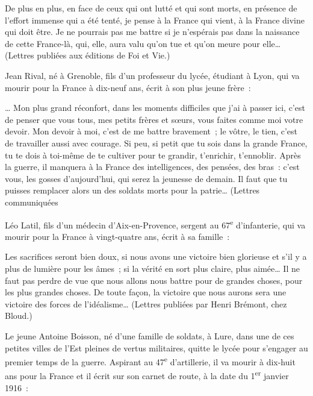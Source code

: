 \documentclass[french,twoside]{book} %
\newenvironment{quoteblock}%
  {\begin{quoting}}
  {\end{quoting}}
\newenvironment{quotebar}{%
    \def\FrameCommand{{\color{rubric!10!}\vrule width 0.5em} \hspace{0.9em}}%
    \def\OuterFrameSep{\itemsep} %
    \MakeFramed {\advance\hsize-\width \FrameRestore}
  }%
  {%
    \endMakeFramed
  }
\renewenvironment{quoteblock}%
  {%
    \savenotes
    \setstretch{0.9}
    \normalfont
    \begin{quotebar}
  }
  {%
    \end{quotebar}
    \spewnotes
  }
\begin{document}
\begin{quoteblock}
 \noindent De plus en plus, en face de ceux qui ont lutté et qui sont morts, en présence de l’effort immense qui a été tenté, je pense à la France qui vient, à la France divine qui doit être. Je ne pourrais pas me battre si je n’espérais pas dans la naissance de cette France-là, qui, elle, aura valu qu’on tue et qu’on meure pour elle… (Lettres publiées aux éditions de Foi et Vie.)‌
 \end{quoteblock}

\noindent Jean Rival, né à Grenoble, fils d’un professeur du lycée, étudiant à Lyon, qui va mourir pour la France à dix-neuf ans, écrit à son plus jeune frère :‌\par

\begin{quoteblock}
 \noindent … Mon plus grand réconfort, dans les moments difficiles que j’ai à passer ici, c’est de penser que vous tous, mes petits frères et sœurs, vous faites comme moi votre devoir. Mon devoir à moi, c’est de me battre bravement ; le vôtre, le tien, c’est de travailler aussi avec courage. Si peu, si petit que tu sois dans la grande France, tu te dois à toi-même de te cultiver pour te grandir, t’enrichir, t’ennoblir. Après la guerre, il manquera à la France des intelligences, des pensées, des bras : c’est vous, les gosses d’aujourd’hui, qui serez la jeunesse de demain. Il faut que tu puisses remplacer alors un des soldats morts pour la patrie… (Lettres communiquées‌
 \end{quoteblock}

\noindent Léo Latil, fils d’un médecin d’Aix-en-Provence, sergent au 67\textsuperscript{e} d’infanterie, qui va mourir pour la France à vingt-quatre ans, écrit à sa famille :‌\par

\begin{quoteblock}
 \noindent Les sacrifices seront bien doux, si nous avons une victoire bien glorieuse et s’il y a plus de lumière pour les âmes ; si la vérité en sort plus claire, plus aimée… Il ne faut pas perdre de vue que nous allons nous battre pour de grandes choses, pour les plus grandes choses. De toute façon, la victoire que nous aurons sera une victoire des forces de l’idéalisme… (Lettres publiées par Henri Brémont, chez Bloud.)‌
 \end{quoteblock}

\noindent Le jeune Antoine Boisson, né d’une famille de soldats, à Lure, dans une de ces petites villes de l’Est pleines de vertus militaires, quitte le lycée pour s’engager au premier temps de la guerre. Aspirant au 47\textsuperscript{e} d’artillerie, il va mourir à dix-huit ans pour la France et il écrit sur son carnet de route, à la date du 1\textsuperscript{er} janvier 1916 :‌\par
\end{document}
